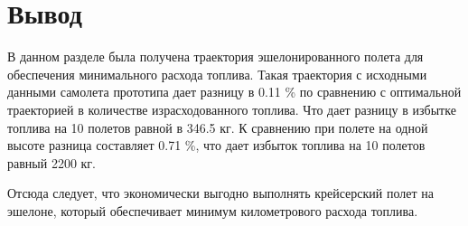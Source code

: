 \section{Вывод}
В данном разделе была получена траектория эшелонированного полета для
обеспечения минимального расхода топлива. Такая траектория с исходными данными
самолета прототипа дает разницу в 0.11 \% по сравнению с оптимальной
траекторией в количестве израсходованного топлива. Что дает разницу в избытке
топлива на 10 полетов равной в 346.5 кг. К сравнению при полете на одной высоте
разница составляет 0.71 \%, что дает избыток топлива на 10 полетов равный 2200 
кг.

Отсюда следует, что экономически выгодно выполнять крейсерский полет на
эшелоне, который обеспечивает минимум километрового расхода топлива. 

